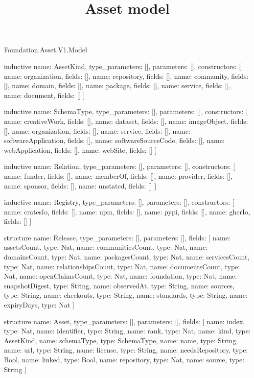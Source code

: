 \begin{lexlean}{Foundation.Asset.V1.Model}
\title{Asset model}
\begin{semanticmodule}
inductive{
  name: AssetKind,
  type_parameters: [],
  parameters: [],
  constructors: [
    {name: organization, fields: []},
    {name: repository, fields: []},
    {name: community, fields: []},
    {name: domain, fields: []},
    {name: package, fields: []},
    {name: service, fields: []},
    {name: document, fields: []}
  ]
}

inductive{
  name: SchemaType,
  type_parameters: [],
  parameters: [],
  constructors: [
    {name: creativeWork, fields: []},
    {name: dataset, fields: []},
    {name: imageObject, fields: []},
    {name: organization, fields: []},
    {name: service, fields: []},
    {name: softwareApplication, fields: []},
    {name: softwareSourceCode, fields: []},
    {name: webApplication, fields: []},
    {name: webSite, fields: []}
  ]
}

inductive{
  name: Relation,
  type_parameters: [],
  parameters: [],
  constructors: [
    {name: funder, fields: []},
    {name: memberOf, fields: []},
    {name: provider, fields: []},
    {name: sponsor, fields: []},
    {name: unstated, fields: []}
  ]
}

inductive{
  name: Registry,
  type_parameters: [],
  parameters: [],
  constructors: [
    {name: cratesIo, fields: []},
    {name: npm, fields: []},
    {name: pypi, fields: []},
    {name: ghcrIo, fields: []}
  ]
}

structure{
  name: Release,
  type_parameters: [],
  parameters: [],
  fields: [
    {name: assetsCount, type: Nat},
    {name: communitiesCount, type: Nat},
    {name: domainsCount, type: Nat},
    {name: packagesCount, type: Nat},
    {name: servicesCount, type: Nat},
    {name: relationshipsCount, type: Nat},
    {name: documentsCount, type: Nat},
    {name: openClaimsCount, type: Nat},
    {name: foundation, type: Nat},
    {name: snapshotDigest, type: String},
    {name: observedAt, type: String},
    {name: sources, type: String},
    {name: checkouts, type: String},
    {name: standards, type: String},
    {name: expiryDays, type: Nat}
  ]
}

structure{
  name: Asset,
  type_parameters: [],
  parameters: [],
  fields: [
    {name: index, type: Nat},
    {name: identifier, type: String},
    {name: rank, type: Nat},
    {name: kind, type: AssetKind},
    {name: schemaType, type: SchemaType},
    {name: name, type: String},
    {name: url, type: String},
    {name: license, type: String},
    {name: needsRepository, type: Bool},
    {name: linked, type: Bool},
    {name: repository, type: Nat},
    {name: source, type: String}
  ]
}


\end{semanticmodule}
\end{lexlean}
